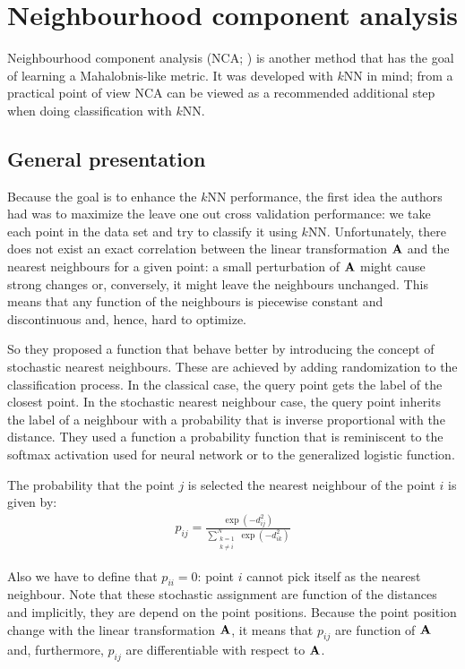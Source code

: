 \chapter{Neighbourhood component analysis}
\label{ch:nca}

	Neighbourhood component analysis (NCA; \citealp{goldberger2004}) is another
	method that has the goal of learning a Mahalobnis-like metric. It was developed
	with $k$NN in mind; from a practical point of view NCA can be viewed as a
	recommended additional step when doing classification with $k$NN. 

\section{General presentation}
\label{sec:general-presentation}

	Because the goal is to enhance the $k$NN performance, the first idea the authors
	had was to maximize the leave one out cross validation performance: we take each 
	point in the data set and try to classify it using $k$NN. Unfortunately, there does
	not exist an exact correlation between the linear transformation $\mathbf{A}$ and the nearest neighbours
	for a given point: a small perturbation of $\mathbf{A}$ might cause strong changes or, conversely, 
	it might leave the neighbours unchanged. This means that any function of the neighbours
	is piecewise constant and discontinuous and, hence, hard to optimize.
	
	So they proposed a function that behave better by introducing the concept of stochastic nearest
	neighbours. These are achieved by adding randomization to the classification process. In the classical case, the query point gets the label of the closest point. In the stochastic nearest neighbour 
	case, the query point inherits the label of a neighbour with a probability that is inverse proportional with the distance. They used a function a probability function that is reminiscent to the softmax activation used for neural network or to the generalized logistic function.
	
	The probability that the point $j$ is selected the nearest neighbour of the point $i$ is given by:
	\begin{align}
		p_{ij} = \frac{
						\exp(-d_{ij}^2)
					  }{
						\sum_{\substack{k=1 \\k\neq i}}^N\exp(-d_{ik}^2)
					  }
	\label{eq:stochastic-neighbour}
	\end{align}
	
	Also we have to define that $p_{ii}=0$: point $i$ cannot pick itself as the nearest neighbour.
	Note that these stochastic assignment are function of the distances and implicitly, they are depend on the point positions. Because the point position change with the linear transformation $\mathbf{A}$, it means that $p_{ij}$ are function of $\mathbf{A}$ and, furthermore, $p_{ij}$ are differentiable with respect to $\mathbf{A}$.
	
